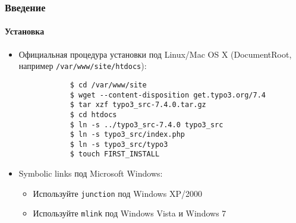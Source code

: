 \begin{frame}[fragile]
	\frametitle{Введение}
	\framesubtitle{Установка}

	\begin{itemize}
		\item Официальная процедура установки под Linux/Mac OS X\newline
			(DocumentRoot, например \texttt{/var/www/site/htdocs}):
		\begin{lstlisting}
			$ cd /var/www/site
			$ wget --content-disposition get.typo3.org/7.4
			$ tar xzf typo3_src-7.4.0.tar.gz
			$ cd htdocs
			$ ln -s ../typo3_src-7.4.0 typo3_src
			$ ln -s typo3_src/index.php
			$ ln -s typo3_src/typo3
			$ touch FIRST_INSTALL
		\end{lstlisting}

		\item Symbolic links под Microsoft Windows:

			\begin{itemize}
				\item Используйте \texttt{junction} под Windows XP/2000
				\item Используйте \texttt{mlink} под Windows Vista и Windows 7
			\end{itemize}

	\end{itemize}
\end{frame}

